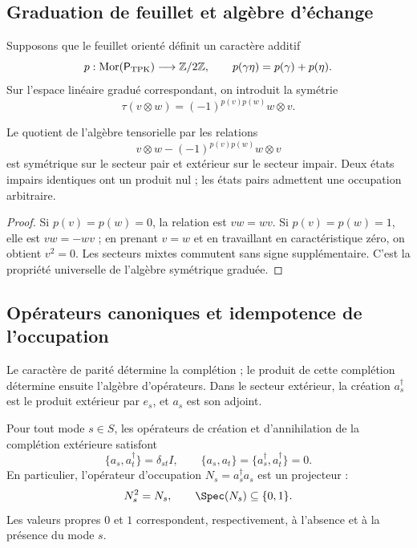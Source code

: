 \subsection{Graduation de feuillet et algèbre d’échange}
\label{v:rec:completaciones:section:04}

Supposons que le feuillet orienté définit un caractère additif
\[
 p:\operatorname{Mor}(\mathsf P_{\rm TPK})\longrightarrow\mathbb Z/2\mathbb Z,
 \qquad p(\gamma\eta)=p(\gamma)+p(\eta).
\]
Sur l’espace linéaire gradué correspondant, on introduit la symétrie
\[
 \tau(v\otimes w)=(-1)^{p(v)p(w)}w\otimes v.
\]

\begin{theorem}
\label{v:rec:completaciones:statement:02}
Le quotient de l’algèbre tensorielle par les relations
\[
 v\otimes w-(-1)^{p(v)p(w)}w\otimes v
\]
est symétrique sur le secteur pair et extérieur sur le secteur impair. Deux états
impairs identiques ont un produit nul ; les états pairs admettent une occupation
arbitraire.
\end{theorem}

\begin{proof}
Si \(p(v)=p(w)=0\), la relation est \(vw=wv\). Si
\(p(v)=p(w)=1\), elle est \(vw=-wv\) ; en prenant \(v=w\) et en travaillant en
caractéristique zéro, on obtient \(v^2=0\). Les secteurs mixtes commutent sans
signe supplémentaire. C’est la propriété universelle de l’algèbre symétrique
graduée.
\end{proof}

\subsection{Opérateurs canoniques et idempotence de l’occupation}
\label{v:pauli:car-construccion}

Le caractère de parité détermine la complétion ; le produit de cette
complétion détermine ensuite l’algèbre d’opérateurs. Dans le
secteur extérieur, la création \(a_s^\dagger\) est le produit extérieur par
\(e_s\), et \(a_s\) est son adjoint.

\begin{theorem}
\label{v:rec:completaciones:statement:01}
\label{v:rec:thm:principio-exclusion-pauli}
Pour tout mode \(s\in S\), les opérateurs de création et d’annihilation de la
complétion extérieure satisfont
\begin{equation}
 \{a_s,a_t^\dagger\}=\delta_{st}I,
 \qquad
 \{a_s,a_t\}=\{a_s^\dagger,a_t^\dagger\}=0.
 \label{v:pauli:eq:car}
\end{equation}
En particulier, l’opérateur d’occupation
\(N_s=a_s^\dagger a_s\) est un projecteur :
\begin{equation}
 N_s^2=N_s,
 \qquad \Spec(N_s)\subseteq\{0,1\}.
 \label{v:pauli:eq:proyeccion-ocupacion}
\end{equation}
Les valeurs propres \(0\) et \(1\) correspondent, respectivement, à l’absence
et à la présence du mode \(s\).
\end{theorem}

